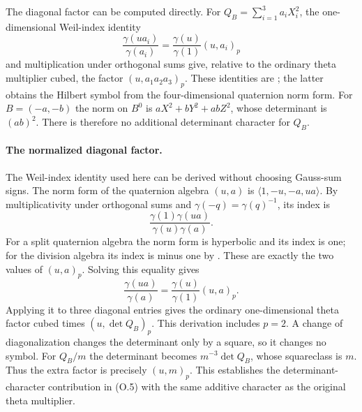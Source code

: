 The diagonal factor can be computed directly.  For
$Q_B=\sum_{i=1}^3 a_iX_i^2$, the one-dimensional Weil-index identity
\[
 \frac{\gamma(ua_i)}{\gamma(a_i)}
       =\frac{\gamma(u)}{\gamma(1)}(u,a_i)_p
\]
and multiplication under orthogonal sums give, relative to the
ordinary theta multiplier cubed, the factor
$(u,a_1a_2a_3)_p$.  These identities are \cite[II.25 and II.28]{weil};
the latter obtains the Hilbert symbol from the four-dimensional
quaternion norm form.  For $B=(-a,-b)$ the norm on $B^0$ is
$aX^2+bY^2+abZ^2$, whose determinant is $(ab)^2$.
There is therefore no additional determinant character for $Q_B$.
\paragraph{The normalized diagonal factor.}
The Weil-index identity used here can be derived without choosing
Gauss-sum signs. The norm form of the quaternion algebra $(u,a)$
is $\langle1,-u,-a,ua\rangle$. By multiplicativity under orthogonal
sums and $\gamma(-q)=\gamma(q)^{-1}$, its index is
\[
 \frac{\gamma(1)\gamma(ua)}{\gamma(u)\gamma(a)}.
\]
For a split quaternion algebra the norm form is hyperbolic and its
index is one; for the division algebra its index is minus one by
\cite[II.28, Proposition 4]{weil}. These are exactly the two values
of $(u,a)_p$. Solving this equality gives
\[
 \frac{\gamma(ua)}{\gamma(a)}
   =\frac{\gamma(u)}{\gamma(1)}(u,a)_p.
\]
Applying it to three diagonal entries gives the ordinary
one-dimensional theta factor cubed times $(u,\det Q_B)_p$.
This derivation includes $p=2$. A change of diagonalization changes
the determinant only by a square, so it changes no symbol.
For $Q_B/m$ the determinant becomes $m^{-3}\det Q_B$, whose
squareclass is $m$. Thus the extra factor is precisely $(u,m)_p$.
This establishes the determinant-character contribution in (O.5)
with the same additive character as the original theta multiplier.


